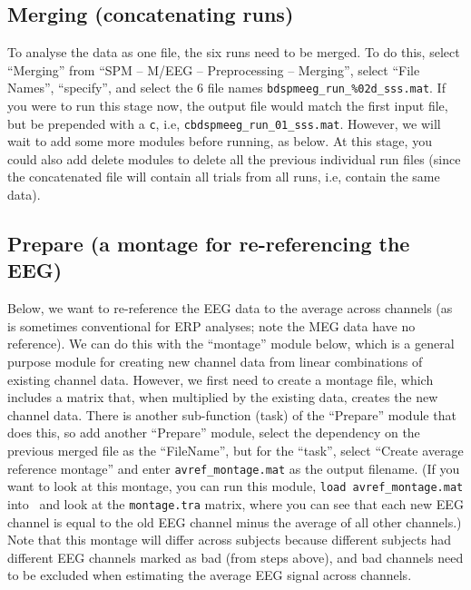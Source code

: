 \subsection{Merging (concatenating runs)}

To analyse the data as one file, the six runs need to be merged. To do this, select ``Merging'' from ``SPM -- M/EEG -- Preprocessing -- Merging'', select ``File Names'', ``specify'', and select the 6 file names \texttt{bdspmeeg\_run\_\%02d\_sss.mat}. If you were to run this stage now, the output file would match the first input file, but be prepended with a \texttt{c}, i.e, \texttt{cbdspmeeg\_run\_01\_sss.mat}. However, we will wait to add some more modules before running, as below. At this stage, you could also add delete modules to delete all the previous individual run files (since the concatenated file will contain all trials from all runs, i.e, contain the same data).

\subsection{Prepare (a montage for re-referencing the EEG)}

Below, we want to re-reference the EEG data to the average across channels (as is sometimes conventional for ERP analyses; note the MEG data have no reference). We can do this with the ``montage'' module below, which is a general purpose module for creating new channel data from linear combinations of existing channel data. However, we first need to create a montage file, which includes a matrix that, when multiplied by the existing data, creates the new channel data. There is another sub-function (task) of the ``Prepare'' module that does this, so add another ``Prepare'' module, select the dependency on the previous merged file as the ``FileName'', but for the ``task'', select ``Create average reference montage'' and enter \texttt{avref\_montage.mat} as the output filename. (If you want to look at this montage, you can run this module, \texttt{load avref\_montage.mat} into \matlab\ and look at the \texttt{montage.tra} matrix, where you can see that each new EEG channel is equal to the old EEG channel minus the average of all other channels.)  Note that this montage will differ across subjects because different subjects had different EEG channels marked as bad (from steps above), and bad channels need to be excluded when estimating the average EEG signal across channels.

